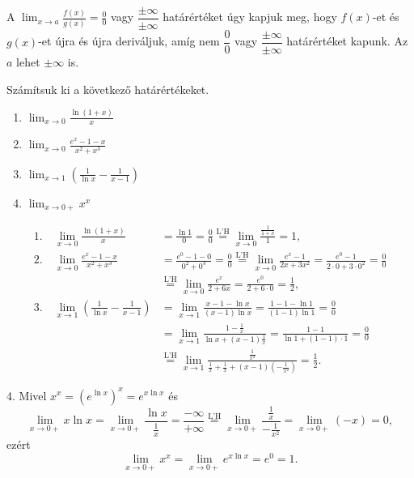 \documentclass[11pt]{article}
\newcommand{\LH}{\overset{\text{L'H}}{=}}
\begin{document}
\begin{procbox}
\begin{procedure}
A $\displaystyle\lim_{x\to a}\frac{f(x)}{g(x)}=\frac{0}{0}$ vagy $\dfrac{\pm\infty}{\pm\infty}$ határértéket úgy kapjuk meg, hogy $f(x)$-et és $g(x)$-et újra és újra deriváljuk, amíg nem $\dfrac{0}{0}$ vagy $\dfrac{\pm\infty}{\pm\infty}$ határértéket kapunk. Az $a$ lehet $\pm\infty$ is.
\end{procedure}
\end{procbox}

\begin{exbox}
\begin{example}
Számítsuk ki a következő határértékeket.
\begin{enumerate}[label=\arabic*., itemsep=6pt]
\item $\displaystyle\lim_{x\to 0}\frac{\ln(1+x)}{x}$
\item $\displaystyle\lim_{x\to 0}\frac{e^{x}-1-x}{x^{2}+x^{3}}$
\item $\displaystyle\lim_{x\to 1}\left(\frac{1}{\ln x}-\frac{1}{x-1}\right)$
\item $\displaystyle\lim_{x\to 0+}x^{x}$
\end{enumerate}
\end{example}
\end{exbox}
\begin{solution}
\begin{align*}
1.\quad \lim_{x\to 0}\frac{\ln(1+x)}{x}&=\frac{\ln 1}{0}=\frac{0}{0}\LH\lim_{x\to 0}\frac{\frac{1}{1+x}}{1}=1,\\[0.4em]
2.\quad \lim_{x\to 0}\frac{e^{x}-1-x}{x^{2}+x^{3}}&=\frac{e^{0}-1-0}{0^{2}+0^{3}}=\frac{0}{0}
\LH\lim_{x\to 0}\frac{e^{x}-1}{2x+3x^{2}}=\frac{e^{0}-1}{2\cdot 0+3\cdot 0^{2}}=\frac{0}{0}\\
&\LH\lim_{x\to 0}\frac{e^{x}}{2+6x}=\frac{e^{0}}{2+6\cdot 0}=\frac{1}{2},\\[0.4em]
3.\quad \lim_{x\to 1}\left(\frac{1}{\ln x}-\frac{1}{x-1}\right)&=\lim_{x\to 1}\frac{x-1-\ln x}{(x-1)\ln x}
=\frac{1-1-\ln 1}{(1-1)\ln 1}=\frac{0}{0}\\
&=\lim_{x\to 1}\frac{1-\frac{1}{x}}{\ln x+(x-1)\frac{1}{x}}=\frac{1-1}{\ln 1+(1-1)\cdot 1}=\frac{0}{0}\\
&\LH\lim_{x\to 1}\frac{\frac{1}{x^{2}}}{\frac{1}{x}+\frac{1}{x}+(x-1)\left(-\frac{1}{x^{2}}\right)}=\frac{1}{2}.
\end{align*}

4. Mivel $x^{x}=\left(e^{\ln x}\right)^{x}=e^{x\ln x}$ és
\[
\lim_{x\to 0+}x\ln x=\lim_{x\to 0+}\frac{\ln x}{\frac{1}{x}}=\frac{-\infty}{+\infty}\LH\lim_{x\to 0+}\frac{\frac{1}{x}}{-\frac{1}{x^{2}}}=\lim_{x\to 0+}(-x)=0,
\]
ezért
\[
\lim_{x\to 0+}x^{x}=\lim_{x\to 0+}e^{x\ln x}=e^{0}=1 .
\]
\end{solution}
\end{document}
